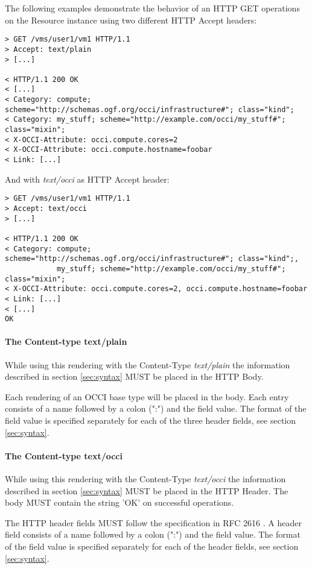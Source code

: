 \documentclass[10pt,a4paper]{article}
\begin{document}
The following examples demonstrate the behavior of an HTTP GET
operations on the Resource instance \emph{} using two different HTTP
Accept headers:

\begin{verbatim}
> GET /vms/user1/vm1 HTTP/1.1
> Accept: text/plain
> [...]
 
< HTTP/1.1 200 OK
< [...]
< Category: compute; scheme="http://schemas.ogf.org/occi/infrastructure#"; class="kind";
< Category: my_stuff; scheme="http://example.com/occi/my_stuff#"; class="mixin"; 
< X-OCCI-Attribute: occi.compute.cores=2
< X-OCCI-Attribute: occi.compute.hostname=foobar
< Link: [...]
\end{verbatim}

And with \emph{text/occi} as HTTP Accept header:

\begin{verbatim}
> GET /vms/user1/vm1 HTTP/1.1
> Accept: text/occi
> [...]
 
< HTTP/1.1 200 OK
< Category: compute; scheme="http://schemas.ogf.org/occi/infrastructure#"; class="kind";,
            my_stuff; scheme="http://example.com/occi/my_stuff#"; class="mixin";
< X-OCCI-Attribute: occi.compute.cores=2, occi.compute.hostname=foobar
< Link: [...]
< [...]
OK
\end{verbatim}

\paragraph{The Content-type text/plain}
While using this rendering with the Content-Type \textit{text/plain}
the information described in section \ref{sec:syntax} MUST be placed
in the HTTP Body.

Each rendering of an OCCI base type will be placed in the body. Each
entry consists of a name followed by a colon (":") and the field
value. The format of the field value is specified separately for each
of the three header fields, see section \ref{sec:syntax}.

\paragraph{The Content-type text/occi}
While using this rendering with the Content-Type \textit{text/occi}
the information described in section \ref{sec:syntax} MUST be placed
in the HTTP Header. The body MUST contain the string 'OK' on
successful operations.

The HTTP header fields MUST follow the specification in RFC 2616
\cite{rfc2616}. A header field consists of a name followed by a colon
(":") and the field value. The format of the field value is specified
separately for each of the header fields, see section
\ref{sec:syntax}.
\end{document}

